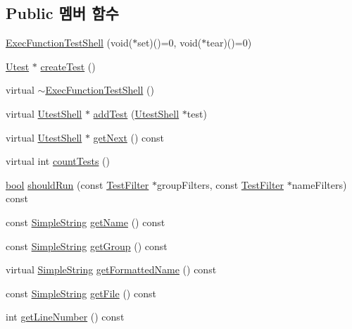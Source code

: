 \subsection*{Public 멤버 함수}
\begin{DoxyCompactItemize}
\item 
\hyperlink{class_exec_function_test_shell_a1ad08047380f3ed13ffb10bc9408a104}{Exec\+Function\+Test\+Shell} (void($\ast$set)()=0, void($\ast$tear)()=0)
\item 
\hyperlink{class_utest}{Utest} $\ast$ \hyperlink{class_exec_function_test_shell_a110b5835a43223b44e9e110f21271a42}{create\+Test} ()
\item 
virtual \hyperlink{class_exec_function_test_shell_a7c443b948ea8701ab9b49d56f01adc0c}{$\sim$\+Exec\+Function\+Test\+Shell} ()
\item 
virtual \hyperlink{class_utest_shell}{Utest\+Shell} $\ast$ \hyperlink{class_utest_shell_a107d518376747143c07442a9e957b613}{add\+Test} (\hyperlink{class_utest_shell}{Utest\+Shell} $\ast$test)
\item 
virtual \hyperlink{class_utest_shell}{Utest\+Shell} $\ast$ \hyperlink{class_utest_shell_a1ac818ddaedf486843c68a5852de42ff}{get\+Next} () const 
\item 
virtual int \hyperlink{class_utest_shell_aabfe7889f5907ce121416805431c4866}{count\+Tests} ()
\item 
\hyperlink{avb__gptp_8h_af6a258d8f3ee5206d682d799316314b1}{bool} \hyperlink{class_utest_shell_aecee9fc54f1114c23fd48360855b8d46}{should\+Run} (const \hyperlink{class_test_filter}{Test\+Filter} $\ast$group\+Filters, const \hyperlink{class_test_filter}{Test\+Filter} $\ast$name\+Filters) const 
\item 
const \hyperlink{class_simple_string}{Simple\+String} \hyperlink{class_utest_shell_a454500e4f7023136a9a6a956323e3a77}{get\+Name} () const 
\item 
const \hyperlink{class_simple_string}{Simple\+String} \hyperlink{class_utest_shell_a9d203c5f3c7cb6d28b66189a20735dca}{get\+Group} () const 
\item 
virtual \hyperlink{class_simple_string}{Simple\+String} \hyperlink{class_utest_shell_af1b3219048ca8ae0e2bb935b813b4b92}{get\+Formatted\+Name} () const 
\item 
const \hyperlink{class_simple_string}{Simple\+String} \hyperlink{class_utest_shell_ac086867db63bc447ebef78844034d289}{get\+File} () const 
\item 
int \hyperlink{class_utest_shell_ae48a165945bebe01fd777069441e614e}{get\+Line\+Number} () const 

\end{DoxyCompactItemize}
